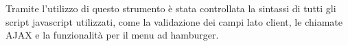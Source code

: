 Tramite l’utilizzo di questo strumento è stata controllata la sintassi di tutti gli script javascript utilizzati, come la validazione dei campi
lato client, le chiamate AJAX e la funzionalità per il menu ad hamburger.